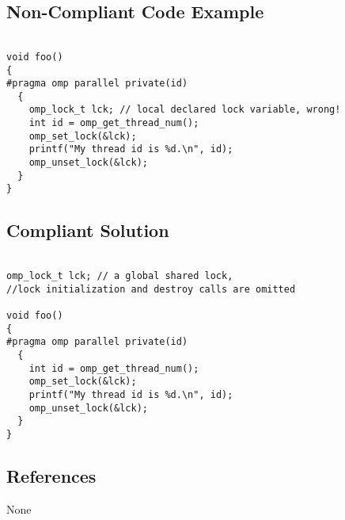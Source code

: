 \subsection{Non-Compliant Code Example}


\begin{verbatim}

void foo()
{
#pragma omp parallel private(id)
  {
    omp_lock_t lck; // local declared lock variable, wrong!
    int id = omp_get_thread_num();
    omp_set_lock(&lck);
    printf("My thread id is %d.\n", id);
    omp_unset_lock(&lck);
  }
}

\end{verbatim}

\subsection{Compliant Solution}


\begin{verbatim}

omp_lock_t lck; // a global shared lock, 
//lock initialization and destroy calls are omitted

void foo()
{
#pragma omp parallel private(id)
  {
    int id = omp_get_thread_num();
    omp_set_lock(&lck);
    printf("My thread id is %d.\n", id);
    omp_unset_lock(&lck);
  }
}
\end{verbatim}

%
%

\subsection{References}
None

